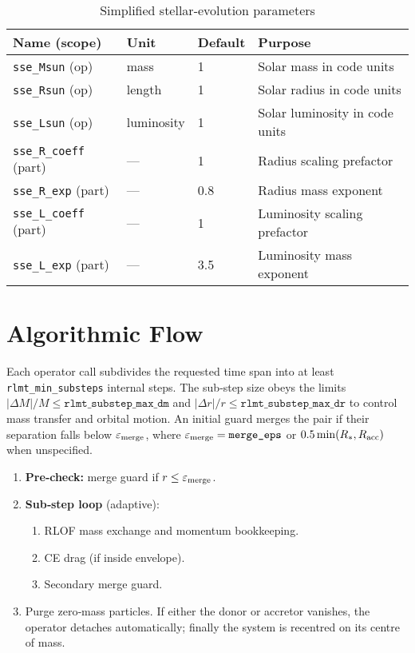 \documentclass[11pt]{article}
\begin{document}
\begin{table}[h]
\centering\footnotesize
\caption{Simplified stellar-evolution parameters}
\label{tab:sse}
\begin{tabular}{@{}llll@{}}
\toprule
Name (scope) & Unit & Default & Purpose \\
\midrule
\texttt{sse\_Msun}   (op) & mass      & 1   & Solar mass in code units\\
\texttt{sse\_Rsun}   (op) & length     & 1   & Solar radius in code units\\
\texttt{sse\_Lsun}   (op) & luminosity & 1   & Solar luminosity in code units\\
\texttt{sse\_R\_coeff} (part) & —       & 1   & Radius scaling prefactor\\
\texttt{sse\_R\_exp}   (part) & —       & 0.8 & Radius mass exponent\\
\texttt{sse\_L\_coeff} (part) & —       & 1   & Luminosity scaling prefactor\\
\texttt{sse\_L\_exp}   (part) & —       & 3.5 & Luminosity mass exponent\\
\bottomrule
\end{tabular}
\end{table}

\section{Algorithmic Flow}

Each operator call subdivides the requested time span into at least
\texttt{rlmt\_min\_substeps} internal steps.  The sub‑step size obeys the
limits $|\Delta M|/M\le\texttt{rlmt\_substep\_max\_dm}$ and
$|\Delta r|/r\le\texttt{rlmt\_substep\_max\_dr}$ to control mass transfer and
orbital motion.  An initial guard merges the pair if their separation falls
below $\varepsilon_{\rm merge}$, where
$\varepsilon_{\rm merge}=\texttt{merge\_eps}$ or
$0.5\min(R_{*},R_{\rm acc})$ when unspecified.

\begin{enumerate}[nosep]
\item \textbf{Pre‑check:} merge guard if $r\le\varepsilon_{\rm merge}$.
\item \textbf{Sub‑step loop} (adaptive):
  \begin{enumerate}[nosep]
    \item RLOF mass exchange and momentum bookkeeping.
    \item CE drag (if inside envelope).
    \item Secondary merge guard.
  \end{enumerate}
\item Purge zero‑mass particles.  If either the donor or accretor vanishes,
      the operator detaches automatically; finally the system is recentred on
      its centre of mass.
\end{enumerate}
\end{document}
